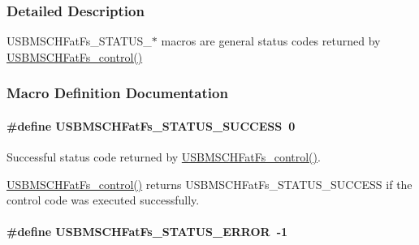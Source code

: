 \subsubsection{Detailed Description}
U\+S\+B\+M\+S\+C\+H\+Fat\+Fs\+\_\+\+S\+T\+A\+T\+U\+S\+\_\+$\ast$ macros are general status codes returned by \hyperlink{_u_s_b_m_s_c_h_fat_fs_8h_a8725aac569cefabe624b5bfda0d07422}{U\+S\+B\+M\+S\+C\+H\+Fat\+Fs\+\_\+control()} 

\subsubsection{Macro Definition Documentation}
\paragraph[{U\+S\+B\+M\+S\+C\+H\+Fat\+Fs\+\_\+\+S\+T\+A\+T\+U\+S\+\_\+\+S\+U\+C\+C\+E\+S\+S}]{\setlength{\rightskip}{0pt plus 5cm}\#define U\+S\+B\+M\+S\+C\+H\+Fat\+Fs\+\_\+\+S\+T\+A\+T\+U\+S\+\_\+\+S\+U\+C\+C\+E\+S\+S~0}\label{group___u_s_b_m_s_c_h_fat_fs___s_t_a_t_u_s_ga40e5ecd349cbaeb9f524b568240822d3}


Successful status code returned by \hyperlink{_u_s_b_m_s_c_h_fat_fs_8h_a8725aac569cefabe624b5bfda0d07422}{U\+S\+B\+M\+S\+C\+H\+Fat\+Fs\+\_\+control()}. 

\hyperlink{_u_s_b_m_s_c_h_fat_fs_8h_a8725aac569cefabe624b5bfda0d07422}{U\+S\+B\+M\+S\+C\+H\+Fat\+Fs\+\_\+control()} returns U\+S\+B\+M\+S\+C\+H\+Fat\+Fs\+\_\+\+S\+T\+A\+T\+U\+S\+\_\+\+S\+U\+C\+C\+E\+S\+S if the control code was executed successfully. 
\paragraph[{U\+S\+B\+M\+S\+C\+H\+Fat\+Fs\+\_\+\+S\+T\+A\+T\+U\+S\+\_\+\+E\+R\+R\+O\+R}]{\setlength{\rightskip}{0pt plus 5cm}\#define U\+S\+B\+M\+S\+C\+H\+Fat\+Fs\+\_\+\+S\+T\+A\+T\+U\+S\+\_\+\+E\+R\+R\+O\+R~-\/1}\label{group___u_s_b_m_s_c_h_fat_fs___s_t_a_t_u_s_gabf90bd396f6e1caf142983768aafee6d}


